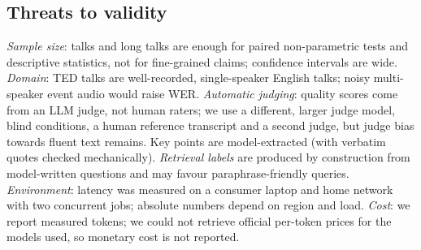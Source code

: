 \subsection{Threats to validity}
\emph{Sample size}: \DatasetTalks{} talks and \DatasetLong{} long talks are enough for paired
non-parametric tests and descriptive statistics, not for fine-grained claims; confidence
intervals are wide. \emph{Domain}: TED talks are well-recorded, single-speaker English
talks; noisy multi-speaker event audio would raise WER. \emph{Automatic judging}: quality
scores come from an LLM judge, not human raters; we use a different, larger judge model,
blind conditions, a human reference transcript and a second judge, but judge bias towards
fluent text remains. Key points are model-extracted (with verbatim quotes checked
mechanically). \emph{Retrieval labels} are produced by construction from model-written
questions and may favour paraphrase-friendly queries. \emph{Environment}: latency was
measured on a consumer laptop and home network with two concurrent jobs; absolute numbers
depend on region and load. \emph{Cost}: we report measured tokens; we could not retrieve
official per-token prices for the models used, so monetary cost is not reported.

